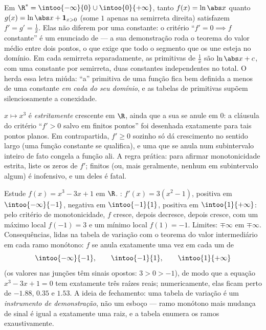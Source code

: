 \begin{example}\label{ex:b1:derivative:intervalmatters}
Em $\R^* = \intoo{-\infty}{0} \cup \intoo{0}{+\infty}$, tanto
$f(x) = \ln\abs x$ quanto $g(x) = \ln\abs x + \mathbf{1}_{x>0}$
(some $1$ apenas na semirreta direita) satisfazem $f' = g' =
\frac1x$. Elas não diferem por uma constante: o critério
``$f' = 0 \implies f$ constante'' é um enunciado de \emph{}
--- a sua demonstração roda o teorema do valor médio entre dois pontos,
o que exige que todo o segmento que os une esteja no domínio. Em cada
semirreta separadamente, as primitivas de $\frac1x$ são
$\ln\abs x + c$, com uma constante por semirreta, duas
constantes independentes no total. O 
herda essa letra miúda: ``a'' primitiva de uma função fica bem definida
a menos de uma constante \emph{em cada  do seu domínio}, e as
tabelas de primitivas supõem silenciosamente a conexidade.
\end{example}

\begin{example}\label{ex:b1:derivative:strictness}
$x \mapsto x^3$ é \emph{estritamente} crescente em $\R$, ainda que
a sua  se anule em $0$: a cláusula do critério
``$f' > 0$ salvo em finitos pontos'' foi desenhada exatamente
para tais pontos planos. Em contrapartida, $f' \geq 0$ sozinho só dá
crescimento no sentido largo (uma função constante se qualifica), e
uma  que se anula num subintervalo inteiro de fato congela a
função ali. A regra prática: para afirmar monotonicidade
estrita, liste os zeros de $f'$; finitos (ou, mais
geralmente, nenhum em subintervalo algum) é inofensivo, e um 
deles é fatal.
\end{example}

\begin{example}\label{ex:b1:derivative:variations}
Estude $f(x) = x^3 - 3x + 1$ em $\R$. : $f'(x) =
3(x^2 - 1)$, positiva em $\intoo{-\infty}{-1}$, negativa em
$\intoo{-1}{1}$, positiva em $\intoo{1}{+\infty}$: pelo
critério de monotonicidade, $f$ cresce, depois decresce, depois
cresce, com um máximo local $f(-1) = 3$ e um mínimo local
$f(1) = -1$. Limites: $\mp\infty$ em $\mp\infty$. Consequências,
lidas na tabela de variação com o teorema do valor
intermediário em cada ramo monótono: $f$ se anula exatamente uma vez em
cada um de
\[
\intoo{-\infty}{-1}, \qquad \intoo{-1}{1}, \qquad
\intoo{1}{+\infty}
\]
(os valores nas junções têm sinais opostos: $3 > 0 > -1$),
de modo que a equação $x^3 - 3x + 1 = 0$ tem exatamente três raízes
reais; numericamente, elas ficam perto de $-1.88$, $0.35$ e $1.53$. A
ideia de fechamento: uma tabela de variação é um \emph{instrumento de
demonstração}, não um esboço --- ramo monótono mais mudança de sinal é
igual a exatamente uma raiz, e a tabela enumera os ramos
exaustivamente.
\end{example}

